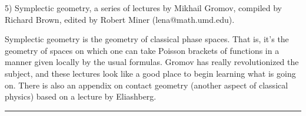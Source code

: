 5) Symplectic geometry, a series of lectures by Mikhail Gromov, compiled
by Richard Brown, edited by Robert Miner (lena@math.umd.edu).  

Symplectic geometry is the geometry of classical phase spaces.  That is,
it's the geometry of spaces on which one can take Poisson brackets of
functions in a manner given locally by the usual formulas.  Gromov has
really revolutionized the subject, and these lectures look like a good
place to begin learning what is going on.  There is also an appendix on
contact geometry (another aspect of classical physics) based on a
lecture by Eliashberg.
\par\noindent\rule{\textwidth}{0.4pt}

